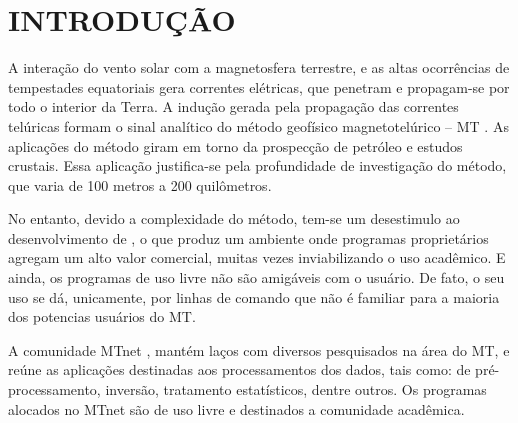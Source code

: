 \setcounter{page}{10}
\chapter{INTRODUÇÃO}
   


    
    
    A interação do vento solar com a magnetosfera terrestre, e as altas ocorrências de tempestades equatoriais gera correntes elétricas, que penetram e propagam-se por todo o interior da Terra. A indução gerada pela propagação das correntes telúricas formam o sinal analítico do método geofísico magnetotelúrico -- MT \cite{parkinson93}. As aplicações do método giram em torno da prospecção de petróleo e estudos crustais. Essa aplicação justifica-se pela profundidade de investigação do método, que varia de 100 metros a 200 quilômetros.

    No entanto, devido a complexidade do método, tem-se um desestimulo ao desenvolvimento de \softwares, o que produz um ambiente onde programas proprietários agregam um alto valor comercial, muitas vezes inviabilizando o uso acadêmico. E ainda, os programas de uso livre não são amigáveis com o usuário. De fato, o seu uso se dá, unicamente, por linhas de comando que não é familiar para a maioria dos potencias usuários do MT.

    A comunidade MTnet \cite{mtnet}, mantém laços com diversos pesquisados na área do MT, e reúne as aplicações destinadas aos processamentos dos dados, tais como:  de pré-processamento, inversão, tratamento estatísticos, dentre outros. Os programas alocados no MTnet são de uso livre e destinados a comunidade acadêmica. %
    
